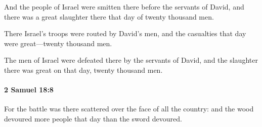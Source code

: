 			\begin{versebox}
					\item[BHS] 
					\item[ASV] And the people of Israel were smitten there before the servants of David, and there was a great slaughter there that day of twenty thousand men.
					\item[NIV] There Israel’s troops were routed by David’s men, and the casualties that day were great—twenty thousand men.
					\item[NRSV] The men of Israel were defeated there by the servants of David, and the slaughter there was great on that day, twenty thousand men.
			\end{versebox}

		\paragraph{2 Samuel 18:8} %
			\label{2SAMUEL-18-8}

			For the battle was there scattered over the face of all the country: and the wood devoured more people that day than the sword devoured.


